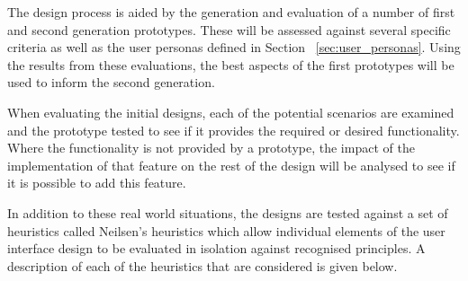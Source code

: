 The design process is aided by the generation and evaluation of a number of
first and second generation prototypes. These will be assessed against several
specific criteria as well as the user personas defined in Section~%
\ref{sec:user_personas}. Using the results from these evaluations, the
best aspects of the first prototypes will be used to inform the second
generation.

When evaluating the initial designs, each of the potential scenarios are
examined and the prototype tested to see if it provides the required or desired
functionality. Where the functionality is not provided by a prototype, the
impact of the implementation of that feature on the rest of the design will be
analysed to see if it is possible to add this feature.

In addition to these real world situations, the designs are tested against a
set of heuristics called Neilsen's heuristics which allow individual elements
of the user interface design to be evaluated in isolation against recognised
principles. A description of each of the heuristics that are considered is
given below.

